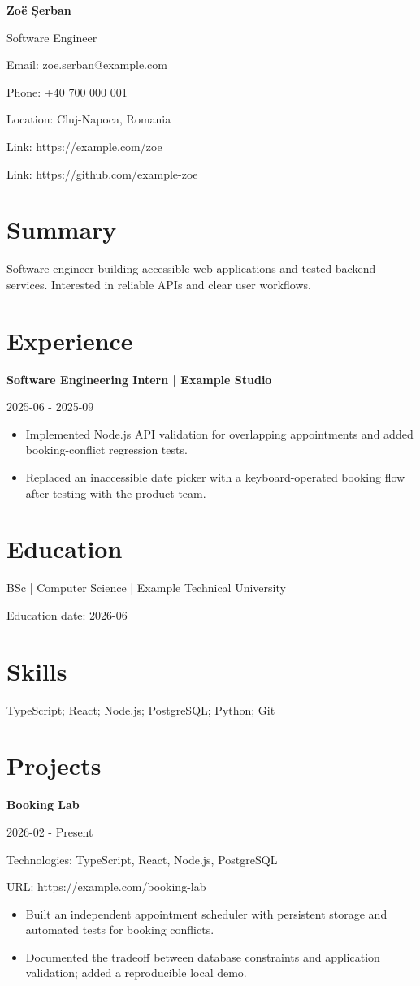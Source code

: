 \documentclass[10pt,a4paper]{article}
\begin{document}
\sffamily

{\LARGE\bfseries Zoë Șerban}\par
Software Engineer\par
Email: zoe.serban@example.com\par
Phone: +40 700 000 001\par
Location: Cluj-Napoca, Romania\par
Link: https://example.com/zoe\par
Link: https://github.com/example-zoe\par
\section*{Summary}
Software engineer building accessible web applications and tested backend services. Interested in reliable APIs and clear user workflows.
\section*{Experience}
\textbf{Software Engineering Intern | Example Studio}\par
2025-06 - 2025-09\par
\begin{itemize}
\item Implemented Node.js API validation for overlapping appointments and added booking-conflict regression tests.
\item Replaced an inaccessible date picker with a keyboard-operated booking flow after testing with the product team.
\end{itemize}
\section*{Education}
BSc | Computer Science | Example Technical University\par
Education date: 2026-06\par
\section*{Skills}
TypeScript; React; Node.js; PostgreSQL; Python; Git
\section*{Projects}
\textbf{Booking Lab}\par
2026-02 - Present\par
Technologies: TypeScript, React, Node.js, PostgreSQL\par
URL: https://example.com/booking-lab\par
\begin{itemize}
\item Built an independent appointment scheduler with persistent storage and automated tests for booking conflicts.
\item Documented the tradeoff between database constraints and application validation; added a reproducible local demo.
\end{itemize}
\end{document}
